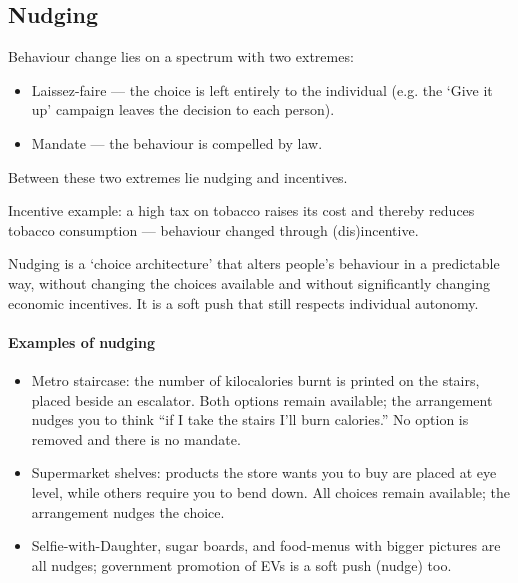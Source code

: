 \subsection{Nudging}

Behaviour change lies on a spectrum with two extremes:

\begin{itemize}
\item Laissez-faire --- the choice is left entirely to the individual (e.g. the `Give it up' campaign leaves the decision to each person).
\item Mandate --- the behaviour is compelled by law.
\end{itemize}

Between these two extremes lie nudging and incentives.

\begin{ExampleBox}
Incentive example: a high tax on tobacco raises its cost and thereby reduces tobacco consumption --- behaviour changed through (dis)incentive.
\end{ExampleBox}

\begin{KeyConcept}
Nudging is a `choice architecture' that alters people's behaviour in a predictable way, without changing the choices available and without significantly changing economic incentives. It is a soft push that still respects individual autonomy.
\end{KeyConcept}

\paragraph{Examples of nudging}
\begin{itemize}
\item Metro staircase: the number of kilocalories burnt is printed on the stairs, placed beside an escalator. Both options remain available; the arrangement nudges you to think ``if I take the stairs I'll burn calories.'' No option is removed and there is no mandate.
\item Supermarket shelves: products the store wants you to buy are placed at eye level, while others require you to bend down. All choices remain available; the arrangement nudges the choice.
\item Selfie-with-Daughter, sugar boards, and food-menus with bigger pictures are all nudges; government promotion of EVs is a soft push (nudge) too.
\end{itemize}

